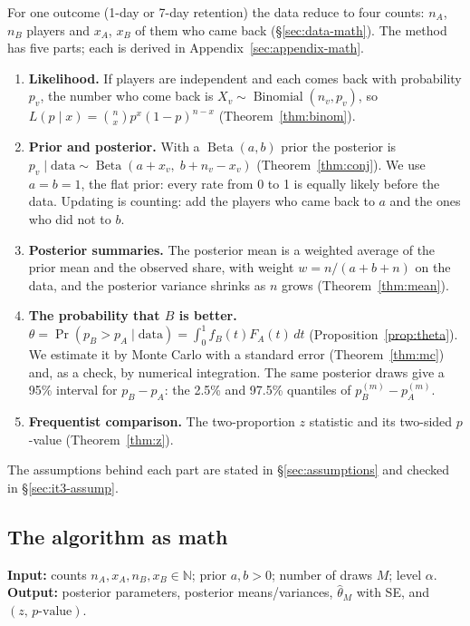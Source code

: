 \documentclass[11pt]{article}
\theoremstyle{definition}
\theoremstyle{remark}
\renewcommand{\Pr}{\operatorname{Pr}}
\newcommand{\Bin}{\operatorname{Binomial}}
\newcommand{\Betad}{\operatorname{Beta}}
\newcommand{\data}{\text{data}}
\begin{document}
For one outcome (1-day or 7-day retention) the data reduce to four counts: $n_A$, $n_B$ players and $x_A$, $x_B$
of them who came back (\S\ref{sec:data-math}). The method has five parts; each is derived in
Appendix~\ref{sec:appendix-math}.
\begin{enumerate}[nosep]
\item \textbf{Likelihood.} If players are independent and each comes back with probability $p_v$, the number who
  come back is $X_v\sim\Bin(n_v,p_v)$, so $L(p\mid x)=\binom nx p^x(1-p)^{n-x}$ (Theorem~\ref{thm:binom}).
\item \textbf{Prior and posterior.} With a $\Betad(a,b)$ prior the posterior is
  $p_v\mid\data\sim\Betad(a+x_v,\;b+n_v-x_v)$ (Theorem~\ref{thm:conj}). We use $a=b=1$, the flat prior: every rate
  from 0 to 1 is equally likely before the data. Updating is counting: add the players who came back to $a$ and the
  ones who did not to $b$.
\item \textbf{Posterior summaries.} The posterior mean is a weighted average of the prior mean and the observed
  share, with weight $w=n/(a+b+n)$ on the data, and the posterior variance shrinks as $n$ grows
  (Theorem~\ref{thm:mean}).
\item \textbf{The probability that $B$ is better.} $\theta=\Pr(p_B>p_A\mid\data)=\int_0^1 f_B(t)F_A(t)\,dt$
  (Proposition~\ref{prop:theta}). We estimate it by Monte Carlo with a standard error (Theorem~\ref{thm:mc}) and,
  as a check, by numerical integration. The same posterior draws give a 95\% interval for $p_B-p_A$: the 2.5\% and
  97.5\% quantiles of $p_B^{(m)}-p_A^{(m)}$.
\item \textbf{Frequentist comparison.} The two-proportion $z$ statistic and its two-sided $p$-value
  (Theorem~\ref{thm:z}).
\end{enumerate}
The assumptions behind each part are stated in \S\ref{sec:assumptions} and checked in \S\ref{sec:it3-assump}.

\subsection{The algorithm as math}\label{sec:algorithm}

\noindent\textbf{Input:} counts $n_A,x_A,n_B,x_B\in\mathbb N$; prior $a,b>0$; number of draws $M$; level $\alpha$.
\textbf{Output:} posterior parameters, posterior means/variances, $\hat\theta_M$ with SE, and $(z,\,p\text{-value})$.
\end{document}

